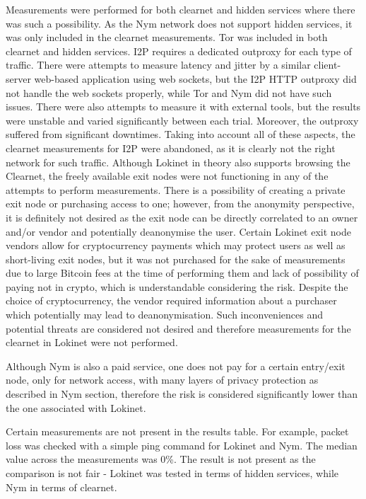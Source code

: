 Measurements were performed for both clearnet and hidden services where there was such a possibility. As the Nym network does not support hidden services, it was only included in the clearnet measurements. Tor was included in both clearnet and hidden services. I2P requires a dedicated outproxy for each type of traffic. There were attempts to measure latency and jitter by a similar client-server web-based application using web sockets, but the I2P HTTP outproxy did not handle the web sockets properly, while Tor and Nym did not have such issues. There were also attempts to measure it with external tools, but the results were unstable and varied significantly between each trial. Moreover, the outproxy suffered from significant downtimes. Taking into account all of these aspects, the clearnet measurements for I2P were abandoned, as it is clearly not the right network for such traffic. Although Lokinet in theory also supports browsing the Clearnet, the freely available exit nodes were not functioning in any of the attempts to perform measurements. There is a possibility of creating a private exit node or purchasing access to one; however, from the anonymity perspective, it is definitely not desired as the exit node can be directly correlated to an owner and/or vendor and potentially deanonymise the user. Certain Lokinet exit node vendors allow for cryptocurrency payments which may protect users as well as short-living exit nodes, but it was not purchased for the sake of measurements due to large Bitcoin fees at the time of performing them and lack of possibility of paying not in crypto, which is understandable considering the risk. Despite the choice of cryptocurrency, the vendor required information about a purchaser which potentially may lead to deanonymisation. Such inconveniences and potential threats are considered not desired and therefore measurements for the clearnet in Lokinet were not performed. 

Although Nym is also a paid service, one does not pay for a certain entry/exit node, only for network access, with many layers of privacy protection as described in Nym section, therefore the risk is considered significantly lower than the one associated with Lokinet.

Certain measurements are not present in the results table. For example, packet loss was checked with a simple ping command for Lokinet and Nym. The median value across the measurements was 0\%. The result is not present as the comparison is not fair - Lokinet was tested in terms of hidden services, while Nym in terms of clearnet.

